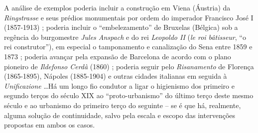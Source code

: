 A análise de exemplos poderia incluir a construção em Viena (Áustria) da \textit{Ringstrasse} e seus prédios monumentais por ordem do imperador Francisco José I (1857-1913) \cite{abercrombie_vienna_1910,abercrombie_vienna_1911,aman_vienna_1911}; poderia incluir o ``embelezamento'' de Bruxelas (Bélgica) sob a regência do burgomestre \textit{Jules Anspach} e do rei \textit{Leopoldo II} (\textit{le roi bâtisseur}, ``o rei construtor''), em especial o tamponamento e canalização do Sena entre 1859 e 1873 \cite{abercrombie_brussels1_1912,abercrombie_brussels2_1912,abercrombie_brussels3_1913}; poderia avançar pela expansão de Barcelona de acordo com o plano pioneiro de \textit{Ildefonso Cerdà} (1860) \cite{aibarbijker_barcelona_1997,ciervo_cerda_1976,soriaypuig_cerda_1995,wynn_barcelona_1979}; poderia seguir pelo \textit{Risanamento} de Florença (1865-1895), Nápoles (1885-1904) e outras cidades italianas em seguida à \textit{Unificazione} \cite{biocca_naples_1992,parisi_napoli_2001,piccinato_igiene_1989,rossi_napoli_2011}\dots Há um longo fio condutor a ligar o higienismo dos primeiro e segundo terços do século XIX ao ``proto-urbanismo'' do último terço deste mesmo século e ao urbanismo do primeiro terço do seguinte -- se é que há, realmente, alguma solução de continuidade, salvo pela escala e escopo das intervenções propostas em ambos os casos. 

